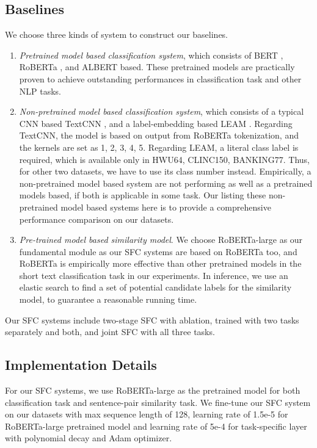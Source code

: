 \subsection{Baselines}
We choose three kinds of system to construct our baselines.

\begin{enumerate}
  \item \emph{Pretrained model based classification system}, which consists of
  BERT \cite{devlin2018bert},  RoBERTa \cite{liu2019roberta},  and  ALBERT  \cite{lan2019albert}  based.  These pretrained
  models  are  practically  proven  to  achieve  outstanding  performances  in
  classification task and other NLP tasks.

  \item   \emph{Non-pretrained   model  based  classification  system},  which
  consists  of  a typical CNN based TextCNN \cite{kim2014convolutional}, and a
  label-embedding based LEAM \cite{wang2018joint}. Regarding TextCNN, the
  model is based on output from RoBERTa tokenization, and the kernels are set
  as 1, 2, 3, 4, 5. Regarding LEAM, a literal class label is required, which
  is available only in HWU64, CLINC150, BANKING77. Thus, for other two
  datasets, we have to use its class number instead.  Empirically,
  a  non-pretrained  model  based  system  are  not  performing  as  well as a
  pretrained  models  based,  if  both is applicable in some task. Our listing
  these  non-pretrained model based systems here is to provide a comprehensive
  performance comparison on our datasets.

  \item   \emph{Pre-trained   model   based   similarity   model}.  We  choose
  RoBERTa-large  as  our  fundamental  module as our SFC systems are based on
  RoBERTa  too, and RoBERTa is empirically more effective than other pretrained
  models  in  the  short  text  classification  task  in  our  experiments. In
  inference,  we  use  an  elastic search to find a set of potential candidate
  labels for the similarity model, to guarantee a reasonable running time.
\end{enumerate}

Our SFC systems include two-stage SFC with ablation, trained with two tasks
separately and both, and joint SFC with all three tasks.

\subsection{Implementation Details}
For  our  SFC  systems,  we  use RoBERTa-large as the pretrained model for both
classification  task  and  sentence-pair similarity task. We fine-tune
our  SFC  system  on  our datasets with max sequence length of 128,
learning  rate  of 1.5e-5 for RoBERTa-large pretrained model and learning rate
of  5e-4  for  task-specific  layer  with polynomial decay and Adam optimizer.

